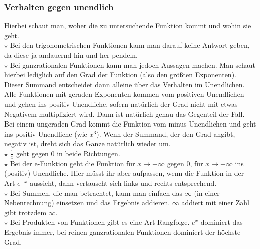 	\subsubsection{Verhalten gegen unendlich}
		Hierbei schaut man, woher die zu untersuchende Funktion kommt und wohin sie
		geht.\\

		\(\star\) Bei den trigonometrischen Funktionen kann man darauf keine Antwort
		geben, da diese ja andauernd hin und her pendeln.\\

		\(\star\) Bei ganzrationalen Funktionen kann man jedoch Aussagen machen. Man
		schaut hierbei lediglich auf den Grad der Funktion (also den größten
		Exponenten). Dieser Summand entscheidet dann alleine über das Verhalten im
		Unendlichen. Alle Funktionen mit geraden Exponenten kommen vom positiven
		Unendlichen und gehen ins positiv Unendliche, sofern natürlich der Grad nicht
		mit etwas Negativem multipliziert wird. Dann ist natürlich genau das Gegenteil
		der Fall.\\
		Bei einem ungeraden Grad kommt die Funktion vom minus Unendlichen und geht ins
		positiv Unendliche (wie \(x^3\)). Wenn der Summand, der den Grad angibt,
		negativ ist, dreht sich das Ganze natürlich wieder um.\\

		\(\star\) \(\frac{1}{x}\) geht gegen 0 in beide Richtungen.\\

		\(\star\) Bei der e-Funktion geht die Funktion für \(x\rightarrow -\infty\)
		gegen 0, für \(x\rightarrow + \infty\) ins (positiv) Unendliche. Hier müsst
		ihr aber aufpassen, wenn die Funktion in der Art \(e^{-x}\) aussieht, dann
		vertauscht sich links und rechts entsprechend.\\

		\(\star\) Bei Summen, die man betrachtet, kann man einfach das \(\infty\) (in
		einer Nebenrechnung) einsetzen und das Ergebnis addieren. \(\infty\) addiert
		mit einer Zahl gibt trotzdem \(\infty\).\\

		\(\star\) Bei Produkten von Funktionen gibt es eine Art Rangfolge. \(e^x\)
		dominiert das Ergebnis immer, bei reinen ganzrationalen Funktionen dominiert
		der höchste Grad.

